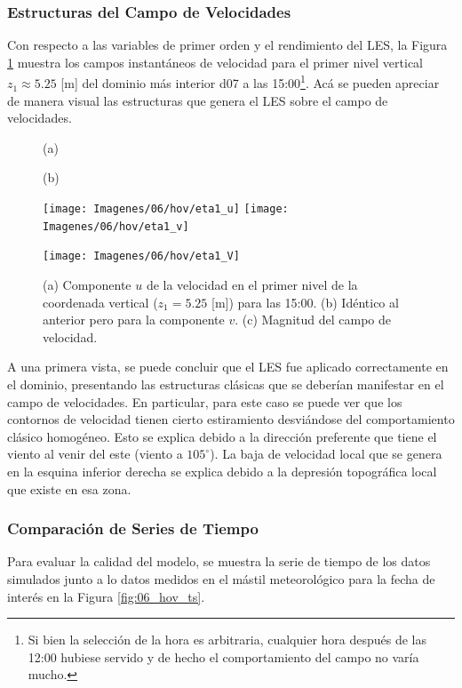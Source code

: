 \subsubsection{Estructuras del Campo de Velocidades}
Con respecto a las variables de primer orden y el rendimiento del LES, la Figura \ref{fig:06_hov_eta1} muestra los campos instantáneos de velocidad para el primer nivel vertical $z_1\approx 5.25$ [m] del dominio más interior d07 a las 15:00\footnote{Si bien la selección de la hora es arbitraria, cualquier hora después de las 12:00 hubiese servido y de hecho el comportamiento del campo no varía mucho.}. Acá se pueden apreciar de manera visual las estructuras que genera el LES sobre el campo de velocidades. 
\begin{figure}[H]
	\centering
	\begin{minipage}{0.5\linewidth}
		\center\hspace{0.3cm}(a)
	\end{minipage}%
	\begin{minipage}{0.5\linewidth}
		\center\hspace{0.3cm}(b)
	\end{minipage}%
	
	\texttt{[image: Imagenes/06/hov/eta1\_u]}%
	\texttt{[image: Imagenes/06/hov/eta1\_v]}%
	
	
	\texttt{[image: Imagenes/06/hov/eta1\_V]}%
	\caption{(a) Componente $u$ de la velocidad en el primer nivel de la coordenada vertical ($z_1=5.25$ [m]) para las 15:00. (b) Idéntico al anterior pero para la componente $v$. (c) Magnitud del campo de velocidad.}
	\label{fig:06_hov_eta1}
\end{figure}
A una primera vista, se puede concluir que el LES fue aplicado correctamente en el dominio, presentando las estructuras clásicas que se deberían manifestar en el campo de velocidades. En particular, para este caso se puede ver que los contornos de velocidad tienen cierto estiramiento desviándose del comportamiento clásico homogéneo. Esto se explica debido a la dirección preferente que tiene el viento al venir del este (viento a $105^\circ$). La baja de velocidad local que se genera en la esquina inferior derecha se explica debido a la depresión topográfica local que existe en esa zona.
\subsubsection{Comparación de Series de Tiempo}
Para evaluar la calidad del modelo, se muestra la serie de tiempo de los datos simulados junto a lo datos medidos en el mástil meteorológico para la fecha de interés en la Figura \ref{fig:06_hov_ts}. 

